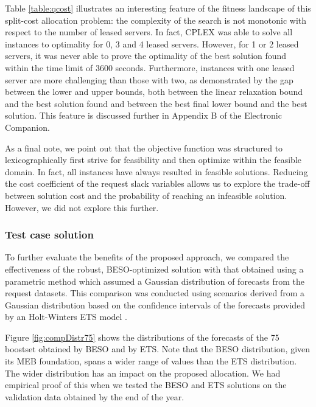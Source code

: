 \documentclass[11pt]{article}
\begin{document}
Table \ref{table:qcost} illustrates an interesting feature of the fitness landscape of this split-cost allocation problem: the complexity of the search is not monotonic with respect to the number of leased servers. In fact, CPLEX was able to solve all instances to optimality for 0, 3 and 4 leased servers. However, for 1 or 2 leased servers, it was never able to prove the optimality of the best solution found within the time limit of 3600 seconds. Furthermore, instances with one leased server are more challenging than those with two, as demonstrated by the gap between the lower and upper bounds, both between the linear relaxation bound and the best solution found and between the best final lower bound and the best solution. This feature is discussed further in Appendix B of the Electronic Companion.

As a final note, we point out that the objective function was structured to lexicographically first strive for feasibility and then optimize within the feasible domain. In fact, all instances have always resulted in feasible solutions. Reducing the cost coefficient of the request slack variables allows us to explore the trade-off between solution cost and the probability of reaching an infeasible solution. However, we did not explore this further.

\subsubsection*{Test case solution}

To further evaluate the benefits of the proposed approach, we compared the effectiveness of the robust, BESO-optimized solution with that obtained using a parametric method which assumed a Gaussian distribution of forecasts from the request datasets. This comparison was conducted using scenarios derived from a Gaussian distribution based on the confidence intervals of the forecasts provided by an Holt-Winters ETS model \citep{HKOS08}.

Figure \ref{fig:compDistr75} shows the distributions of the forecasts of the 75 boostset obtained by BESO and by ETS. Note that the BESO distribution, given its MEB foundation, spans a wider range of values than the ETS distribution.
The wider distribution has an impact on the proposed allocation. We had empirical proof of this when we tested the BESO and ETS solutions on the validation data obtained by the end of the year.
\end{document}

